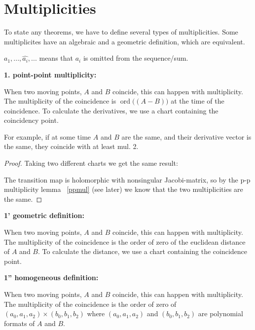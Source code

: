 \documentclass[a4paper]{article}
\newcommand{\ord}{\operatorname{ord}}
\begin{document}
\section{Multiplicities}
To state any theorems, we have to define several types of multiplicities. Some multiplicites have an algebraic and a geometric definition, which are equivalent.



$a_1,...,\widehat{a_i},...$ means that $a_i$ is omitted from the sequence/sum.


\textbf{1. point-point multiplicity:}

When two moving points, $A$ and $B$ coincide, this can happen with multiplicity.
The multiplicity of the coincidence is $\ord\bigl((A-B)\bigr)$ at the time of the coincidence. To calculate the derivatives, we use a chart containing the coincidency point.

For example, if at some time $A$ and $B$ are the same, and their derivative vector is the same, they coincide with at least mul. 2.

\begin{proof}
    Taking two different charts we get the same result:

    The transition map is holomorphic with nonsingular Jacobi-matrix, so by the p-p multiplicity lemma ~\ref{ppmul} (see later) we know that the two multiplicities are the same.
\end{proof}

\textbf{1' geometric definition:}

When two moving points, $A$ and $B$ coincide, this can happen with multiplicity.
The multiplicity of the coincidence is the order of zero of the euclidean distance of $A$ and $B$. To calculate the distance, we use a chart containing the coincidence point.

\textbf{1'' homogeneous definition:}

When two moving points, $A$ and $B$ coincide, this can happen with multiplicity.
The multiplicity of the coincidence is the order of zero of $(a_0,a_1,a_2)\times (b_0,b_1,b_2)$ where $(a_0,a_1,a_2)$ and $(b_0,b_1,b_2)$ are polynomial formats of $A$ and $B$.
\end{document}
